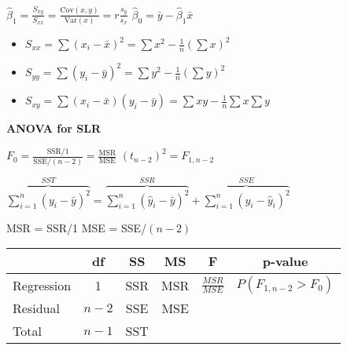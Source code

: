 \documentclass[twocolumn]{article}
\begin{document}
$\hat{\beta}_1 = \frac{S_{xy}}{S_{xx}} = \frac{\text{Cov}(x, y)}{\text{Var}(x)} = r \frac{s_y}{s_x}$ \hfill $\hat{\beta}_0 = \bar{y} - \hat{\beta}_1 \bar{x}$

\vspace{-.5em}
\begin{itemize}
    \item $S_{xx} = \sum (x_i - \bar{x})^2 = \sum x^2 - \frac{1}{n} \left( \sum x \right)^2$
    \item $S_{yy} = \sum (y_i - \bar{y})^2 = \sum y^2 - \frac{1}{n} \left( \sum y \right)^2$
    \item $S_{xy} = \sum (x_i - \bar{x}) (y_i - \bar{y}) = \sum xy - \frac{1}{n} \sum x \sum y$
\end{itemize} \vspace{-.5em}

\vspace{-.5em}
\dotfill

\textbf{ANOVA for SLR}

$F_0 = \frac{\text{SSR}/1}{\text{SSE} / (n-2)} = \frac{\text{MSR}}{\text{MSE}}$ \hfill $(t_{n-2})^2 = F_{1, n-2}$

$\overbrace{\sum_{i=1}^n (y_i - \bar{y})^2}^{SST} = \overbrace{\sum_{i=1}^n (\hat{y}_i - \bar{y})^2}^{SSR} + \overbrace{\sum_{i=1}^n (y_i - \hat{y}_i)^2}^{SSE}$

MSR = SSR/1 \hfill MSE = SSE/$(n-2)$


\vspace{-.5em}
\begin{table}[ht]
    \centering
    \begin{tabular}{lccccc}
        \toprule
        & df & SS & MS & F & p-value \\
        \midrule
        Regression & 1 & SSR & MSR & $\textstyle\frac{MSR}{MSE}$ & $P(F_{1,n-2} > F_0)$ \\
        Residual & $n-2$ & SSE & MSE \\
        Total & $n-1$ & SST \\
        \bottomrule
    \end{tabular}
\end{table} \vspace{-.5em}
\end{document}
